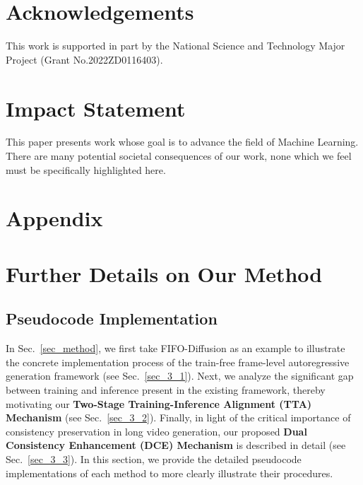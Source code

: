 \documentclass{article}
\theoremstyle{plain}
\theoremstyle{definition}
\theoremstyle{remark}
\begin{document}
\section*{Acknowledgements}
This work is supported in part by the National Science and Technology Major Project (Grant No.2022ZD0116403).

\section*{Impact Statement}

This paper presents work whose goal is to advance the field of Machine
Learning. There are many potential societal consequences of our work, none
which we feel must be specifically highlighted here.

\nocite{langley00}




\newpage
\appendix
\onecolumn
\setcounter{table}{0}
\renewcommand{\thetable}{A\arabic{table}}
\setcounter{equation}{0}
\renewcommand{\theequation}{A\arabic{equation}}
\setcounter{figure}{0}
\renewcommand{\thefigure}{A\arabic{figure}}

\section*{Appendix}



\section{Further Details on Our Method}
\subsection{Pseudocode Implementation}
\label{app:pseudocode}
In Sec.~\ref{sec_method}, we first take FIFO-Diffusion as an example to illustrate the concrete implementation process of the train-free frame-level autoregressive generation framework (see Sec.~\ref{sec_3_1}). Next, we analyze the significant gap between training and inference present in the existing framework, thereby motivating our \textbf{Two-Stage Training-Inference Alignment (TTA) Mechanism } (see Sec.~\ref{sec_3_2}).
Finally, in light of the critical importance of consistency preservation in long video generation, our proposed \textbf{Dual Consistency Enhancement (DCE) Mechanism } is described in detail (see Sec.~\ref{sec_3_3}).
In this section, we provide the detailed pseudocode implementations of each method to more clearly illustrate their procedures.
\end{document}

